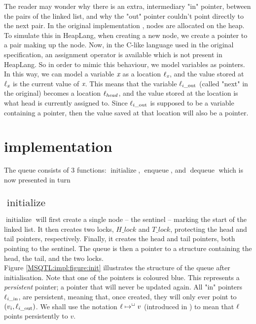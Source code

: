 \documentclass[twoside,11pt,openright]{report}
\newcommand{\initialise}{\operatorname{initialize}}
\newcommand{\enqueue}{\operatorname{enqueue}}
\newcommand{\dequeue}{\operatorname{dequeue}}
\newcommand{\locin}[1]{\loc_{#1\_\text{in}}}
\newcommand{\locout}[1]{\loc_{#1\_\text{out}}}
\begin{document}
The reader may wonder why there is an extra, intermediary "in" pointer, between the pairs of the linked list, and why the "out" pointer couldn't point directly to the next pair. In the original implementation \cite{DBLP:conf/podc/MichaelS96}, nodes are allocated on the heap. To simulate this in HeapLang, when creating a new node, we create a pointer to a pair making up the node. Now, in the C-like language used in the original specification, an assignment operator is available which is not present in HeapLang. So in order to mimic this behaviour, we model variables as pointers. In this way, we can model a variable $\textit{x}$ as a location $\ell_{\textit{x}}$, and the value stored at $\ell_{\textit{x}}$ is the current value of $\textit{x}$. This means that the variable $\locout{i}$ (called "next" in the original) becomes a location $\ell_{head}$, and the value stored at the location is what head is currently assigned to. Since $\locout{i}$ is supposed to be a variable containing a pointer, then the value saved at that location will also be a pointer.


\section{implementation}\label{section:two_lock:impl}

The queue consists of 3 functions: $\initialise$, $\enqueue$, and $\dequeue$ which is now presented in turn

\subsection[initialise]{$\initialise$}

$\initialise$ will first create a single node -- the sentinel -- marking the start of the linked list. It then creates two locks, $H\_lock$ and $T\_lock$, protecting the head and tail pointers, respectively. Finally, it creates the head and tail pointers, both pointing to the sentinel. The queue is then a pointer to a structure containing the head, the tail, and the two locks.\\
Figure \ref{MSQTL:impl:figure:init} illustrates the structure of the queue after initialisation. Note that one of the pointers is coloured blue. This represents a \emph{persistent} pointer; a pointer that will never be updated again. All "in" pointers $\locin{i}$, are persistent, meaning that, once created, they will only ever point to $(v_i, \locout{i})$. We shall use the notation $\ell \mapsto^{\mathop{\Box}} v$ (introduced in \cite{DBLP:conf/cpp/VindumB21}) to mean that $\ell$ points persistently to $v$.
\end{document}
